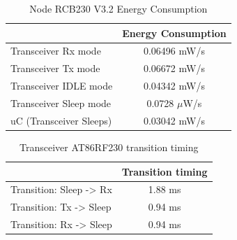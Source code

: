 \begin{table}
 \begin{center}
  \begin{tabular}{|l|c|}
   \hline
   & \textbf{Energy Consumption} \\
   \hline
   Transceiver \ac{Rx} mode & 0.06496 mW/s \\
   \hline 
   Transceiver \ac{Tx} mode & 0.06672 mW/s \\
   \hline
   Transceiver IDLE mode & 0.04342 mW/s \\
   \hline
   Transceiver Sleep mode & 0.0728 $\mu$W/s \\
   \hline
   \ac{uC} (Transceiver Sleeps) & 0.03042 mW/s \\
   \hline
  \end{tabular}
  \caption{Node RCB230 V3.2 Energy Consumption \cite{LPLandOLP}}
  \label{tab:NodeEnergyConsumption}
 \end{center}
\end{table}
\begin{table}
 \begin{center}
  \begin{tabular}{|l|c|}
   \hline
   & \textbf{Transition timing} \\
   \hline
   Transition: Sleep -> \ac{Rx} & 1.88 ms \\
   \hline 
   Transition: \ac{Tx} -> Sleep & 0.94 ms \\
   \hline
   Transition: \ac{Rx} -> Sleep & 0.94 ms \\
   \hline
  \end{tabular}
  \caption{Transceiver AT86RF230 transition timing \cite{LPLandOLP}}
  \label{tab:NodeTiming}
 \end{center}
\end{table}

